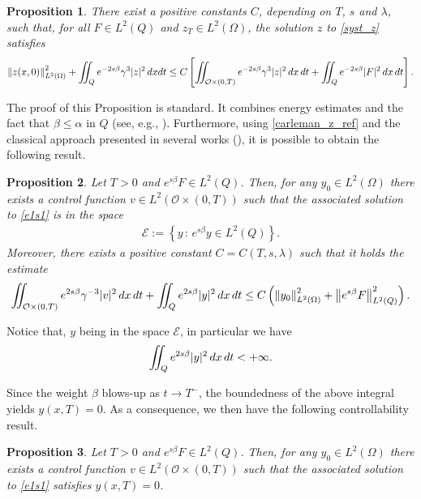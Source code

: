 \documentclass{amsart}    %
\newcommand{\norm}[2]{\left\|#1\right\|_{#2}}
\newcommand{\intd}{\displaystyle\int \kern -7pt \int}
\newtheorem{proposition}{\bf Proposition}[section]
\begin{document}
\begin{proposition}
There exist a positive constants $C$, depending on $T$, $s$ and $\lambda$, such that, for all $F\in L^2(Q)$ and $z_T\in L^2(\Omega)$, the solution $z$ to \eqref{syst_z} satisfies 
\begin{align}\label{carleman_z_ref}
	\norm{z(x,0)}{L^2(\Omega)}^2 + \intd_Q e^{-2s\beta}\gamma^3|z|^2\,dxdt \leq C \left[\intd_{\mathcal O\times(0,T)} e^{-2s\beta}\gamma^3 |z|^2\,dx\,dt + \intd_Q e^{-2s\beta}|F|^2\,dx\,dt\right].
\end{align}
\end{proposition}

The proof of this Proposition is standard. It combines energy estimates and the fact that $\beta\leq\alpha$ in $Q$ (see, e.g., \cite{fernandez2004local}). Furthermore, using \eqref{carleman_z_ref} and the classical approach presented in several works (\cite{fernandez2004local,fursikov1996controllability,gueye2013insensitizing,tao2016null}), it is possible to obtain the following result.

\begin{proposition}\label{control_prop_F}
Let $T>0$ and $e^{s\beta}F\in L^2(Q)$. Then, for any $y_0\in L^2(\Omega)$ there exists a control function $v\in L^2(\mathcal O\times(0,T))$ such that the associated solution to \eqref{e1s1} is in the space
\begin{align*}
	\mathcal E:=\left\{y\,:\,e^{s\beta}y\in L^2(Q)\right\}.
\end{align*}
Moreover, there exists a positive constant $C=C(T,s,\lambda)$ such that it holds the estimate
\begin{align}\label{energy_weight}
	\intd_{\mathcal O\times(0,T)} e^{2s\beta}\gamma^{-3} |v|^2\,dx\,dt + \intd_Q e^{2s\beta}|y|^2\,dx\,dt 
	 \leq C \left(\norm{y_0}{L^2(\Omega)}^2 + \norm{e^{s\beta}F}{L^2(Q)}^2\right).
\end{align}
\end{proposition} 
Notice that, $y$ being in the space $\mathcal E$, in particular we have 
\begin{align*}
	\intd_Q e^{2s\beta}|y|^2\,dx\,dt < +\infty.
\end{align*}

Since the weight $\beta$ blows-up as $t\to T^-$, the boundedness of the above integral yields $y(x,T)=0$. As a consequence, we then have the following controllability result.
\begin{proposition}
Let $T>0$ and $e^{s\beta}F\in L^2(Q)$. Then, for any $y_0\in L^2(\Omega)$ there exists a control function $v\in L^2(\mathcal O\times(0,T))$ such that the associated solution to \eqref{e1s1} satisfies $y(x,T)=0$.
\end{proposition} 
 
\end{document}
